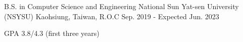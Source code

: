 

\begin{cventries}

  \cventry
    {B.S. in Computer Science and Engineering} %
    {National Sun Yat-sen University (NSYSU)} %
    {Kaohsiung, Taiwan, R.O.C} %
    {Sep. 2019 - Expected Jun. 2023} %
    {
      \begin{cvitems} %
        \item {GPA 3.8/4.3 (first three years)}
      \end{cvitems}
    }

\end{cventries}
